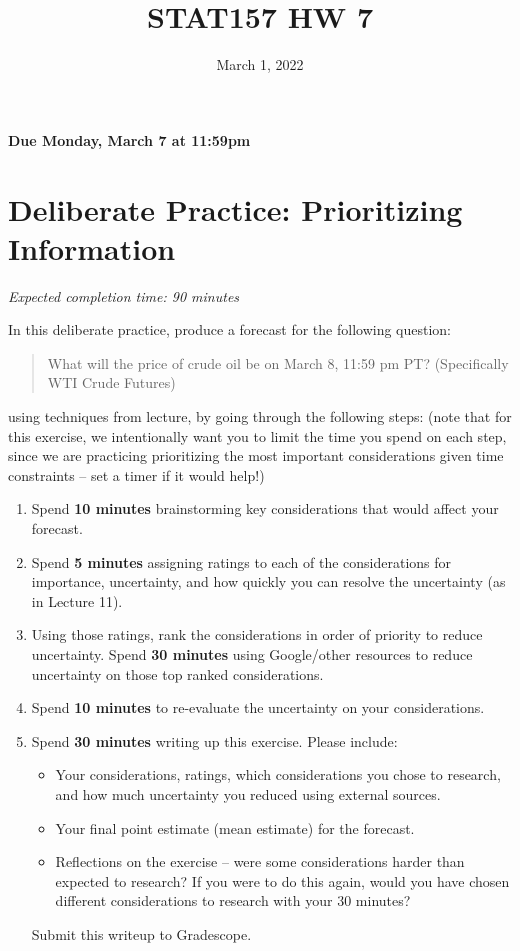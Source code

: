 \documentclass[11pt]{article}
\title{STAT157 HW 7}
\date{March 1, 2022}
\begin{document}
\maketitle

\hfill \textbf{Due Monday, March 7 at 11:59pm}

\section*{Deliberate Practice: Prioritizing Information}

\emph{Expected completion time: 90 minutes}

In this deliberate practice, produce a forecast for the following question:
\begin{quote}
	What will the price of crude oil be on March 8, 11:59 pm PT? (Specifically WTI Crude Futures)
\end{quote}
using techniques from lecture, by going through the following steps: (note that for this exercise, we intentionally want you to limit the time you spend on each step, since we are practicing prioritizing the most important considerations given time constraints -- set a timer if it would help!)

\begin{enumerate}
	\item Spend \textbf{10 minutes} brainstorming key considerations that would affect your forecast. 
	\item Spend \textbf{5 minutes} assigning ratings to each of the considerations for importance, uncertainty, and how quickly you can resolve the uncertainty (as in Lecture 11).
	\item Using those ratings, rank the considerations in order of priority to reduce uncertainty. Spend \textbf{30 minutes} using Google/other resources to reduce uncertainty on those top ranked considerations. 
	\item Spend \textbf{10 minutes} to re-evaluate the uncertainty on your considerations.
	\item Spend \textbf{30 minutes} writing up this exercise. Please include:
	\begin{itemize}
		\item Your considerations, ratings, which considerations you chose to research, and how much uncertainty you reduced using external sources.
		\item Your final point estimate (mean estimate) for the forecast.
		\item Reflections on the exercise -- were some considerations harder than expected to research? If you were to do this again, would you have chosen different considerations to research with your 30 minutes?
	\end{itemize}
 Submit this writeup to Gradescope.
\end{enumerate}  
\end{document}
